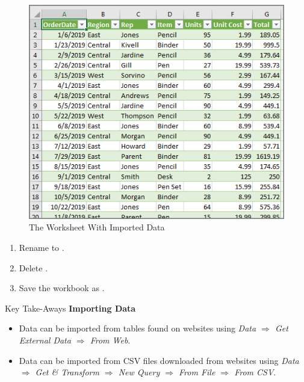 \begin{figure}[H]
	\centering
	\includegraphics[width=\maxwidth{.95\linewidth}]{gfx/ch07_fig10}
	\caption{The Worksheet With Imported Data}
	\label{07:fig10}
\end{figure}

\begin{enumerate}[resume]
	\item Rename  to .
	\item Delete .
	\item Save the workbook as .
\end{enumerate}

\begin{center}
	\begin{tkwbox}{Key Take-Aways}
		\textbf{Importing Data}
		\\
		\begin{itemize}
			\setlength{\itemsep}{0pt}
			\setlength{\parskip}{0pt}
			\setlength{\parsep}{0pt}
			
			\item Data can be imported from tables found on websites using \textit{Data $ \Rightarrow $ Get External Data $ \Rightarrow $ From Web}. 
			\item Data can be imported from CSV files downloaded from websites using \textit{Data $ \Rightarrow $ Get \& Transform $ \Rightarrow $ New Query $ \Rightarrow $ From File $ \Rightarrow $ From CSV}.
			
		\end{itemize}
	\end{tkwbox}
\end{center}

